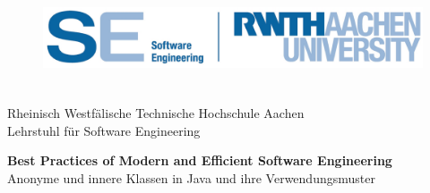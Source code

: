 %

\setcounter{page}{1}

\thispagestyle{headings}


\begin{titlepage}

\begin{figure}\raggedleft\includegraphics[height=3.0cm]{src/pic/logo.eps}\end{figure}


\vspace*{-1.5em}

\begin{flushleft}
  {
    {\LARGE
      Rheinisch Westfälische Technische Hochschule Aachen \\
      Lehrstuhl für Software Engineering \\}
    \vspace{3em}

    {\LARGE \textbf{Best Practices of Modern and Efficient Software Engineering}\\}
    {\LARGE {Anonyme und innere Klassen in Java und ihre Verwendungsmuster}\\}
    \emptyLine
    \emptyLine
    \vspace{3em}

}
\end{flushleft}
\end{titlepage}

